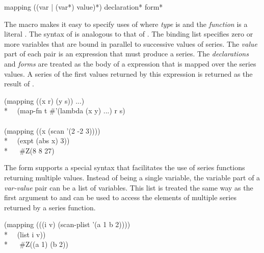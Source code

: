 \begin{defmac}
mapping ({({var | ({var}*)} value)}*) {declaration}* {form}*

The macro  makes it easy to specify uses of 
where \emph{type} is  and the \emph{function} is a literal 
.  The syntax of  is analogous to that of .
The binding list specifies zero or more variables that are bound in parallel to
successive values of series.  The \emph{value} part of each pair is
an expression that must produce a
series.  The \emph{declarations} and \emph{forms} are
treated as the body of a  expression
that is mapped over the series values.  A series of the first values
returned by this  expression is returned as the result of 
.
\begin{lisp}
(mapping ((x r) (y s)) ...) {\EQ} \\*
~~(map-fn t \#'(lambda (x y) ...) r s) \\
\\
(mapping ((x (scan '(2 -2 3)))) \\*
~~(expt (abs x) 3)) \\*
~~{\EV} \#Z(8 8 27)
\end{lisp}

The form  supports a special syntax that facilitates the
use of series functions returning multiple values.  Instead of being
a single variable, the variable part of a \emph{var-value} pair can be a list of
variables.  This list is treated the same way as the first argument to
 and can be used to access the elements of
multiple series returned by a series function.
\begin{lisp}
(mapping (((i v) (scan-plist '(a 1 b 2)))) \\*
~~(list i v)) \\*
~~{\EV} \#Z((a 1) (b 2))
\end{lisp}
\end{defmac}

